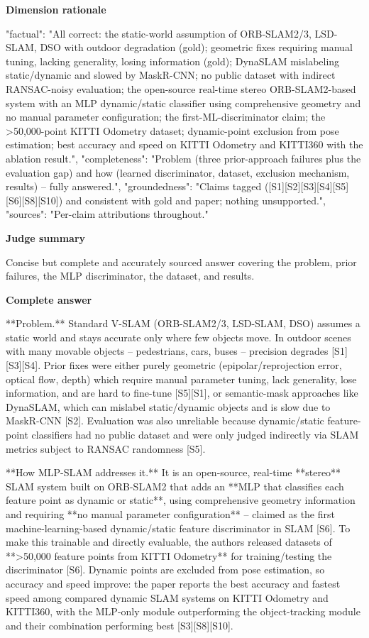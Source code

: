 \documentclass[10pt]{article}
\begin{document}
\textbf{Dimension rationale}
\begin{EvidenceText}
{
  "factual": "All correct: the static-world assumption of ORB-SLAM2/3, LSD-SLAM, DSO with outdoor degradation (gold); geometric fixes requiring manual tuning, lacking generality, losing information (gold); DynaSLAM mislabeling static/dynamic and slowed by MaskR-CNN; no public dataset with indirect RANSAC-noisy evaluation; the open-source real-time stereo ORB-SLAM2-based system with an MLP dynamic/static classifier using comprehensive geometry and no manual parameter configuration; the first-ML-discriminator claim; the >50,000-point KITTI Odometry dataset; dynamic-point exclusion from pose estimation; best accuracy and speed on KITTI Odometry and KITTI360 with the ablation result.",
  "completeness": "Problem (three prior-approach failures plus the evaluation gap) and how (learned discriminator, dataset, exclusion mechanism, results) -- fully answered.",
  "groundedness": "Claims tagged ([S1][S2][S3][S4][S5][S6][S8][S10]) and consistent with gold and paper; nothing unsupported.",
  "sources": "Per-claim attributions throughout."
}
\end{EvidenceText}

\textbf{Judge summary}
\begin{EvidenceText}
Concise but complete and accurately sourced answer covering the problem, prior failures, the MLP discriminator, the dataset, and results.
\end{EvidenceText}

\textbf{Complete answer}
\begin{AnswerText}
**Problem.** Standard V-SLAM (ORB-SLAM2/3, LSD-SLAM, DSO) assumes a static world and stays accurate only where few objects move. In outdoor scenes with many movable objects -- pedestrians, cars, buses -- precision degrades [S1][S3][S4]. Prior fixes were either purely geometric (epipolar/reprojection error, optical flow, depth) which require manual parameter tuning, lack generality, lose information, and are hard to fine-tune [S5][S1], or semantic-mask approaches like DynaSLAM, which can mislabel static/dynamic objects and is slow due to MaskR-CNN [S2]. Evaluation was also unreliable because dynamic/static feature-point classifiers had no public dataset and were only judged indirectly via SLAM metrics subject to RANSAC randomness [S5].

**How MLP-SLAM addresses it.** It is an open-source, real-time **stereo** SLAM system built on ORB-SLAM2 that adds an **MLP that classifies each feature point as dynamic or static**, using comprehensive geometry information and requiring **no manual parameter configuration** -- claimed as the first machine-learning-based dynamic/static feature discriminator in SLAM [S6]. To make this trainable and directly evaluable, the authors released datasets of **>50,000 feature points from KITTI Odometry** for training/testing the discriminator [S6]. Dynamic points are excluded from pose estimation, so accuracy and speed improve: the paper reports the best accuracy and fastest speed among compared dynamic SLAM systems on KITTI Odometry and KITTI360, with the MLP-only module outperforming the object-tracking module and their combination performing best [S3][S8][S10].
\end{AnswerText}
\end{document}
